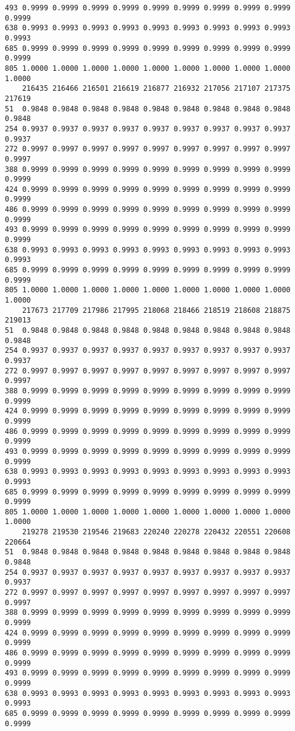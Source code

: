 \documentclass[
]{report}
\begin{document}
\begin{verbatim}
493 0.9999 0.9999 0.9999 0.9999 0.9999 0.9999 0.9999 0.9999 0.9999 0.9999
638 0.9993 0.9993 0.9993 0.9993 0.9993 0.9993 0.9993 0.9993 0.9993 0.9993
685 0.9999 0.9999 0.9999 0.9999 0.9999 0.9999 0.9999 0.9999 0.9999 0.9999
805 1.0000 1.0000 1.0000 1.0000 1.0000 1.0000 1.0000 1.0000 1.0000 1.0000
    216435 216466 216501 216619 216877 216932 217056 217107 217375 217619
51  0.9848 0.9848 0.9848 0.9848 0.9848 0.9848 0.9848 0.9848 0.9848 0.9848
254 0.9937 0.9937 0.9937 0.9937 0.9937 0.9937 0.9937 0.9937 0.9937 0.9937
272 0.9997 0.9997 0.9997 0.9997 0.9997 0.9997 0.9997 0.9997 0.9997 0.9997
388 0.9999 0.9999 0.9999 0.9999 0.9999 0.9999 0.9999 0.9999 0.9999 0.9999
424 0.9999 0.9999 0.9999 0.9999 0.9999 0.9999 0.9999 0.9999 0.9999 0.9999
486 0.9999 0.9999 0.9999 0.9999 0.9999 0.9999 0.9999 0.9999 0.9999 0.9999
493 0.9999 0.9999 0.9999 0.9999 0.9999 0.9999 0.9999 0.9999 0.9999 0.9999
638 0.9993 0.9993 0.9993 0.9993 0.9993 0.9993 0.9993 0.9993 0.9993 0.9993
685 0.9999 0.9999 0.9999 0.9999 0.9999 0.9999 0.9999 0.9999 0.9999 0.9999
805 1.0000 1.0000 1.0000 1.0000 1.0000 1.0000 1.0000 1.0000 1.0000 1.0000
    217673 217709 217986 217995 218068 218466 218519 218608 218875 219013
51  0.9848 0.9848 0.9848 0.9848 0.9848 0.9848 0.9848 0.9848 0.9848 0.9848
254 0.9937 0.9937 0.9937 0.9937 0.9937 0.9937 0.9937 0.9937 0.9937 0.9937
272 0.9997 0.9997 0.9997 0.9997 0.9997 0.9997 0.9997 0.9997 0.9997 0.9997
388 0.9999 0.9999 0.9999 0.9999 0.9999 0.9999 0.9999 0.9999 0.9999 0.9999
424 0.9999 0.9999 0.9999 0.9999 0.9999 0.9999 0.9999 0.9999 0.9999 0.9999
486 0.9999 0.9999 0.9999 0.9999 0.9999 0.9999 0.9999 0.9999 0.9999 0.9999
493 0.9999 0.9999 0.9999 0.9999 0.9999 0.9999 0.9999 0.9999 0.9999 0.9999
638 0.9993 0.9993 0.9993 0.9993 0.9993 0.9993 0.9993 0.9993 0.9993 0.9993
685 0.9999 0.9999 0.9999 0.9999 0.9999 0.9999 0.9999 0.9999 0.9999 0.9999
805 1.0000 1.0000 1.0000 1.0000 1.0000 1.0000 1.0000 1.0000 1.0000 1.0000
    219278 219530 219546 219683 220240 220278 220432 220551 220608 220664
51  0.9848 0.9848 0.9848 0.9848 0.9848 0.9848 0.9848 0.9848 0.9848 0.9848
254 0.9937 0.9937 0.9937 0.9937 0.9937 0.9937 0.9937 0.9937 0.9937 0.9937
272 0.9997 0.9997 0.9997 0.9997 0.9997 0.9997 0.9997 0.9997 0.9997 0.9997
388 0.9999 0.9999 0.9999 0.9999 0.9999 0.9999 0.9999 0.9999 0.9999 0.9999
424 0.9999 0.9999 0.9999 0.9999 0.9999 0.9999 0.9999 0.9999 0.9999 0.9999
486 0.9999 0.9999 0.9999 0.9999 0.9999 0.9999 0.9999 0.9999 0.9999 0.9999
493 0.9999 0.9999 0.9999 0.9999 0.9999 0.9999 0.9999 0.9999 0.9999 0.9999
638 0.9993 0.9993 0.9993 0.9993 0.9993 0.9993 0.9993 0.9993 0.9993 0.9993
685 0.9999 0.9999 0.9999 0.9999 0.9999 0.9999 0.9999 0.9999 0.9999 0.9999

\end{verbatim}
\end{document}
